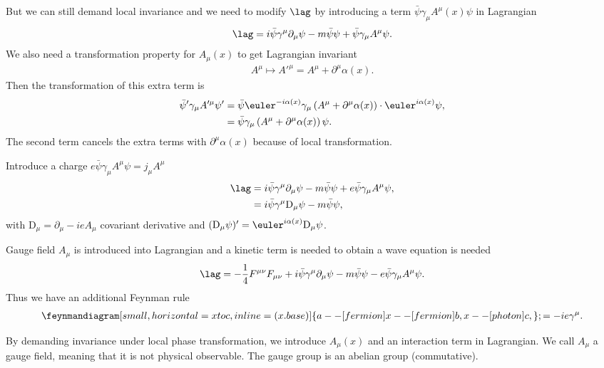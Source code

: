 But we can still demand local invariance and we need to modify $\lag$ by introducing a term $\bar{\psi} \gamma_\mu A^\mu(x) \psi$ in Lagrangian
\begin{align}
   \lag = i \bar\psi \gamma^\mu \partial_\mu \psi - m \bar\psi \psi + \bar\psi \gamma_\mu A^\mu \psi.
\end{align}
We also need a transformation property for $A_\mu(x)$ to get Lagrangian invariant
\begin{align}
   A^\mu \mapsto A'^\mu = A^\mu + \partial^\mu \alpha(x).
\end{align}
Then the transformation of this extra term is
\begin{align*}
   \bar\psi' \gamma_\mu A'^\mu \psi' &=  \bar{\psi} \euler^{-i\alpha(x)} \gamma_\mu \left( A^\mu + \partial^\mu \alpha(x) \right) \cdot \euler^{i\alpha(x)}\psi,  \\
                     &= \bar{\psi} \gamma_\mu \left( A^\mu + \partial^\mu \alpha(x) \right) \psi.
\end{align*}
The second term cancels the extra terms with $\partial^\mu \alpha(x)$ because of local transformation.

Introduce a charge $e \bar\psi \gamma_\mu A^\mu \psi = j_\mu A^\mu$
\begin{align}
   \lag &= i \bar\psi \gamma^\mu \partial_\mu \psi - m \bar\psi \psi + e \bar\psi \gamma_\mu A^\mu \psi, \notag \\
        &= i \bar\psi \gamma^\mu \text{D}_\mu \psi - m \bar\psi \psi,
\end{align}
with $\text{D}_\mu = \partial_\mu -ieA_\mu$ covariant derivative and $(\text{D}_\mu \psi)' = \euler^{i\alpha(x)} \text{D}_\mu \psi$.

Gauge field $A_\mu$ is introduced into Lagrangian and a kinetic term is needed to obtain a wave equation is needed
\begin{align}
   \lag &= -\frac{1}{4}F^{\mu\nu}F_{\mu\nu} +  i \bar\psi \gamma^\mu \partial_\mu \psi - m \bar\psi \psi - e \bar\psi \gamma_\mu A^\mu \psi. \notag \\
\end{align}
Thus we have an additional Feynman rule
\begin{align}
   \feynmandiagram[small, horizontal=x to c, inline=(x.base)]{ a --[fermion]x --[fermion]b, x --[photon] c,}; = -ie\gamma^\mu.
\end{align}

By demanding invariance under local phase transformation, we introduce $A_\mu(x)$ and an interaction term in Lagrangian. We call $A_\mu$ a gauge field, meaning that it is not physical observable. The gauge group is an abelian group (commutative).

